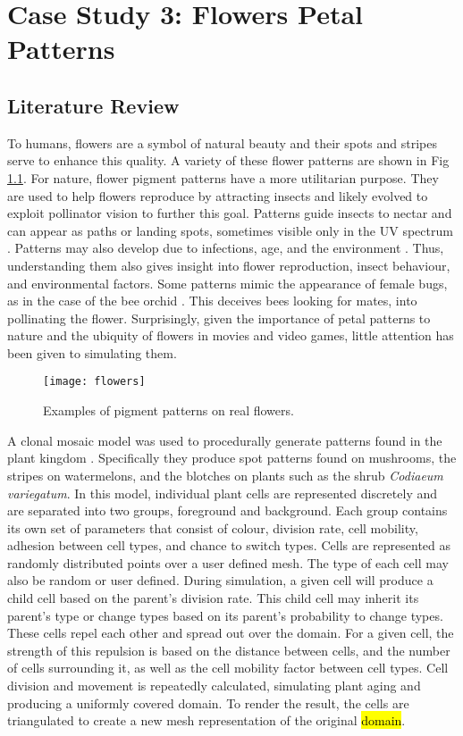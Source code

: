 \chapter{Case Study 3: Flowers Petal Patterns}

\section{Literature Review}
To humans, flowers are a symbol of natural beauty and their spots and stripes serve to enhance this quality. A variety of these flower patterns are shown in Fig \ref{fig:realFlowers}. For nature, flower pigment patterns have a more  utilitarian purpose. They are used to help flowers reproduce by attracting insects and likely evolved to exploit pollinator vision to further this goal. Patterns guide insects to nectar and can appear as paths or landing spots, sometimes visible only in the UV spectrum \cite{Davies2012}. Patterns may also develop due to infections, age, and the environment \cite{Davies2012} \cite{ROBINSON2015}. Thus, understanding them also gives insight into flower reproduction, insect behaviour, and environmental factors. Some patterns mimic the appearance of female bugs, as in the case of the bee orchid \cite{Vereecken7484}. This deceives bees looking for mates, into pollinating the flower. Surprisingly, given the importance of petal patterns to nature and the ubiquity of flowers in movies and video games, little attention has been given to simulating them. 

\clearpage
\begin{figure}[!ht]
	\centering
	\texttt{[image: flowers]}
	\caption{Examples of pigment patterns on real flowers.}
	\label{fig:realFlowers}
\end{figure}
A clonal mosaic model was used to procedurally generate patterns found in the plant kingdom \cite{binsfeld2011}. Specifically they produce spot patterns found on mushrooms, the stripes on watermelons, and the blotches on plants such as the shrub \textit{Codiaeum variegatum}. In this model, individual plant cells are represented discretely and are separated into two groups, foreground and background. Each group contains its own set of parameters that consist of colour, division rate, cell mobility, adhesion between cell types, and chance to switch types. Cells are represented as randomly distributed points over a user defined mesh. The type of each cell may also be random or user defined. During simulation, a given cell will produce a child cell based on the parent's division rate. This child cell may inherit its parent's type or change types based on its parent's probability to change types. These cells repel each other and spread out over the domain. For a given cell, the strength of this repulsion is based on the distance between cells, and the number of cells surrounding it, as well as the cell mobility factor between cell types. Cell division and movement is repeatedly calculated, simulating plant aging and producing a uniformly covered domain. To render the result, the cells are triangulated to create a new mesh representation of the original \hl{domain}. 

